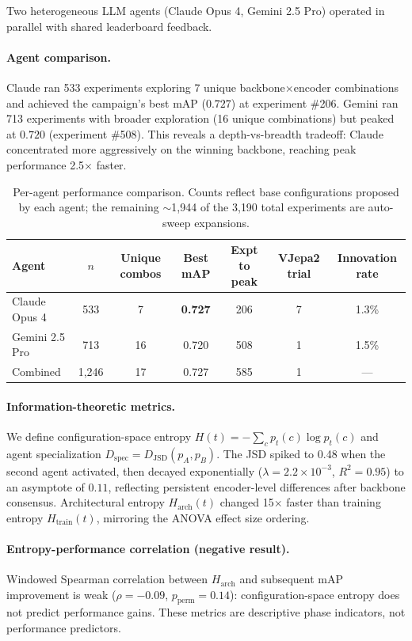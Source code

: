 \documentclass{article}
\newcommand{\JSD}{D_{\mathrm{JSD}}}
\begin{document}
Two heterogeneous LLM agents (Claude Opus 4, Gemini 2.5 Pro) operated in parallel with shared leaderboard feedback.

\paragraph{Agent comparison.}
Claude ran 533 experiments exploring 7 unique backbone$\times$encoder combinations and achieved the campaign's best mAP ($0.727$) at experiment \#206. Gemini ran 713 experiments with broader exploration (16 unique combinations) but peaked at $0.720$ (experiment \#508). This reveals a depth-vs-breadth tradeoff: Claude concentrated more aggressively on the winning backbone, reaching peak performance 2.5$\times$ faster.

\begin{table}[ht]
\centering
\caption{Per-agent performance comparison. Counts reflect base configurations proposed by each agent; the remaining $\sim$1{,}944 of the 3{,}190 total experiments are auto-sweep expansions.}
\label{tab:agent_comparison}
\small
\begin{tabular}{@{}lcccccc@{}}
\toprule
Agent & $n$ & Unique combos & Best mAP & Expt to peak & VJepa2 trial & Innovation rate \\
\midrule
Claude Opus 4 & 533 & 7 & \textbf{0.727} & 206 & 7 & 1.3\% \\
Gemini 2.5 Pro & 713 & 16 & 0.720 & 508 & 1 & 1.5\% \\
Combined & 1{,}246 & 17 & 0.727 & 585 & 1 & --- \\
\bottomrule
\end{tabular}
\end{table}

\paragraph{Information-theoretic metrics.}
We define configuration-space entropy $H(t) = -\sum_{c} p_t(c) \log p_t(c)$ and agent specialization $D_{\mathrm{spec}} = \JSD(p_A, p_B)$.
The JSD spiked to 0.48 when the second agent activated, then decayed exponentially ($\lambda = 2.2 \times 10^{-3}$, $R^2 = 0.95$) to an asymptote of $0.11$, reflecting persistent encoder-level differences after backbone consensus.
Architectural entropy $H_{\mathrm{arch}}(t)$ changed 15$\times$ faster than training entropy $H_{\mathrm{train}}(t)$, mirroring the ANOVA effect size ordering.

\paragraph{Entropy-performance correlation (negative result).}
Windowed Spearman correlation between $H_{\mathrm{arch}}$ and subsequent mAP improvement is weak ($\rho = -0.09$, $p_{\mathrm{perm}} = 0.14$): configuration-space entropy does not predict performance gains. These metrics are descriptive phase indicators, not performance predictors.
\end{document}
